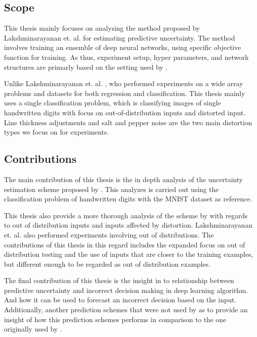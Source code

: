 
\subsection{Scope}

This thesis mainly focuses on analysing the method proposed by Lakshminarayanan et. al. \cite{lakshminarayanan2017simple} for estimating predictive uncertainty. The method involves training an ensemble of deep neural networks, using specific objective function for training. As thus, experiment setup, hyper parameters, and network structures are primarly based on the setting used by \cite{lakshminarayanan2017simple}.

Unlike Lakshminarayanan et. al. \cite{lakshminarayanan2017simple}, who performed experiments on a wide array problems and datasets for both regression and classification. This thesis mainly uses a single classification problem, which is classifying images of single handwritten digits with focus on out-of-distribution inputs and distorted input. Line thickness adjustments and salt and pepper noise are the two main distortion types we focus on for experiments.

\subsection{Contributions}

The main contribution of this thesis is the in depth analysis of the uncertainty estimation scheme proposed by \cite{lakshminarayanan2017simple}. This analyzes is carried out using the classification problem of handwritten digits with the MNIST dataset as reference.

This thesis also provide a more thorough analysis of the scheme by \cite{lakshminarayanan2017simple} with regards to out of distribution inputs and inputs affected by distortion. Lakshminarayanan et. al. also performed experiments involving out of distributions. The contributions of this thesis in this regard includes the expanded focus on out of distribution testing and the use of inputs that are closer to the training examples, but different enough to be regarded as out of distribution examples. 

The final contribution of this thesis is the insight in to relationship between predictive uncertainty and incorrect decision making in deep learning algorithm. And how it can be used to forecast an incorrect decision based on the input. Additionally, another prediction schemes that were not used by \cite{lakshminarayanan2017simple} as to provide an insight of how this prediction schemes performs in comparison to the one originally used by \cite{lakshminarayanan2017simple}.

